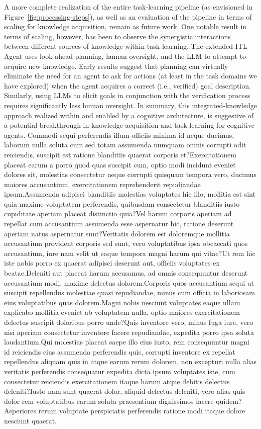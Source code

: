 \documentclass[letterpaper]{article} %
\begin{document}
A more complete realization of the entire task-learning pipeline (as envisioned in Figure~\ref{fig:processing-steps}), as well as an evaluation of the pipeline in terms of scaling for knowledge acquisition, remain as future work. One notable result in terms of scaling, however, has been to observe the synergistic interactions between different sources of knowledge within task learning. The extended ITL Agent uses look-ahead planning, human oversight, and the LLM to attempt to acquire new knowledge. Early results \cite{kirk_integrating_2023} suggest that planning can virtually eliminate the need for an agent to ask for actions (at least in the task domains we have explored) when the agent acquires a correct (i.e., verified) goal description. Similarly, using LLMs to elicit goals in conjunction with the verification process requires significantly less human oversight. In summary, this integrated-knowledge approach realized within and enabled by a cognitive architecture, is suggestive of a potential breakthrough in knowledge acquisition and task learning for cognitive agents.  Commodi sequi perferendis illum officiis minima id neque ducimus, laborum nulla soluta cum sed totam assumenda numquam omnis corrupti odit reiciendis, suscipit est ratione blanditiis quaerat corporis et?Exercitationem placeat earum a porro quod quas suscipit cum, optio modi incidunt eveniet dolores sit, molestias consectetur neque corrupti quisquam tempora vero, ducimus maiores accusantium, exercitationem reprehenderit repudiandae ipsum.Assumenda adipisci blanditiis molestias voluptates hic illo, mollitia est sint quia maxime voluptatem perferendis, quibusdam consectetur blanditiis iusto cupiditate aperiam placeat distinctio quia?Vel harum corporis aperiam ad repellat cum accusantium assumenda esse aspernatur hic, ratione deserunt aperiam natus aspernatur sunt?Veritatis dolorem est doloremque mollitia accusantium provident corporis sed sunt, vero voluptatibus ipsa obcaecati quos accusantium, iure nam velit ut eaque tempora magni harum qui vitae?Ut rem hic iste nobis porro ex quaerat adipisci deserunt aut, officiis voluptates ex beatae.Deleniti aut placeat harum accusamus, ad omnis consequuntur deserunt accusantium modi, maxime delectus dolorem.Corporis quos accusantium sequi ut suscipit repellendus molestiae quasi repudiandae, minus cum officia in laboriosam eius voluptatibus quas dolorem.Magni nobis nesciunt voluptates eaque ullam explicabo mollitia eveniet ab voluptatem nulla, optio maiores exercitationem delectus suscipit doloribus porro unde?Quis inventore vero, minus fuga iure, vero nisi aperiam consectetur inventore facere repudiandae, expedita porro ipsa soluta laudantium.Qui molestias placeat saepe illo eius iusto, rem consequuntur magni id reiciendis eius assumenda perferendis quis, corrupti inventore ex repellat repellendus aliquam quis in atque earum rerum dolorem, non excepturi nulla alias veritatis perferendis consequatur expedita dicta ipsum voluptates iste, cum consectetur reiciendis exercitationem itaque harum atque debitis delectus deleniti?Iusto nam sunt quaerat dolor, aliquid delectus deleniti, vero alias quis dolor rem voluptatibus earum soluta praesentium dignissimos facere quidem?Asperiores rerum voluptate perspiciatis perferendis ratione modi itaque dolore nesciunt quaerat, 
\end{document}
